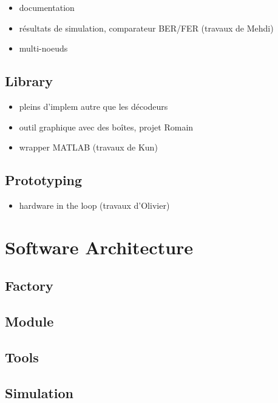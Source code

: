 \begin{itemize}
  \item documentation
  \item résultats de simulation, comparateur BER/FER (travaux de Mehdi)
  \item multi-noeuds
\end{itemize}

\subsection{Library~\cite{Cassagne2019a}}

\begin{itemize}
  \item pleins d'implem autre que les décodeurs
  \item outil graphique avec des boîtes, projet Romain
  \item wrapper MATLAB (travaux de Kun)
\end{itemize}

\subsection{Prototyping~\cite{Cassagne2017,Cassagne2017a}}

\begin{itemize}
  \item hardware in the loop (travaux d'Olivier)
\end{itemize}

\section{Software Architecture}

\subsection{Factory}

\subsection{Module}

\subsection{Tools}

\subsection{Simulation}

